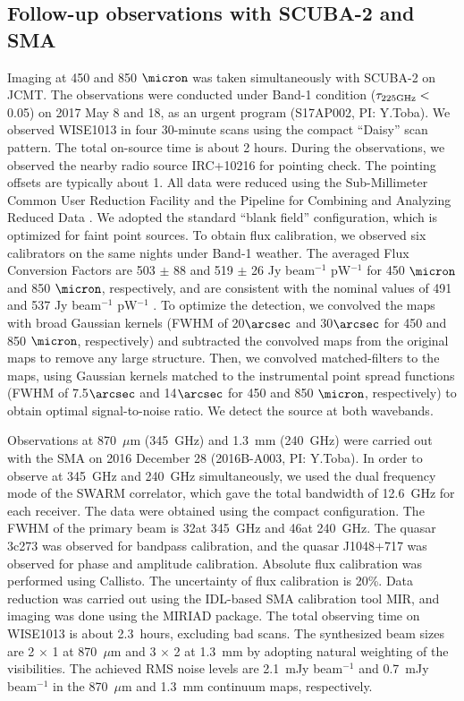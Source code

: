 \documentclass[twocolumn]{aastex6}
\begin{document}
\subsection{Follow-up observations with SCUBA-2 and SMA}
\label{F_obs}
Imaging at 450 and 850 $\micron$ was taken simultaneously with SCUBA-2 on JCMT. 
The observations were conducted under Band-1 condition ($\tau_{\rm 225GHz} <$ 0.05) on 2017 May 8 and 18, as an urgent program (S17AP002, PI: Y.Toba). 
We observed WISE1013 in four 30-minute scans using the compact ``Daisy'' scan pattern. 
The total on-source time is about 2 hours. 
During the observations, we observed the nearby radio source IRC+10216 for pointing check. 
The pointing offsets are typically about 1\arcsec.
All data were reduced using the Sub-Millimeter Common User Reduction Facility \citep[SMURF: ][]{Chapin} and the Pipeline for Combining and Analyzing Reduced Data \citep[PICARD: ][]{Jenness}. 
We adopted the standard ``blank field'' configuration, which is optimized for faint point sources. 
To obtain flux calibration, we observed six calibrators on the same nights under Band-1 weather. 
The averaged Flux Conversion Factors are 503 $\pm$ 88 and 519 $\pm$ 26 Jy beam$^{-1}$ pW$^{-1}$ for 450 $\micron$ and 850 $\micron$, respectively, and are consistent with the nominal values of 491 and 537 Jy beam$^{-1}$ pW$^{-1}$ \citep{Dempsey}.
To optimize the detection, we convolved the maps with broad Gaussian kernels (FWHM of 20$\arcsec$ and 30$\arcsec$ for 450 and 850 $\micron$, respectively) and subtracted the convolved maps from the original maps to remove any large structure. 
Then, we convolved matched-filters to the maps, using Gaussian kernels matched to the instrumental point spread functions (FWHM of 7.5$\arcsec$ and 14$\arcsec$ for 450 and 850 $\micron$, respectively) to obtain optimal signal-to-noise ratio. 
We detect the source at both wavebands. 

Observations at 870~$\mu$m (345~GHz) and 1.3~mm (240~GHz) were carried out with the SMA on 2016 December 28 (2016B-A003, PI: Y.Toba).  
In order to observe at 345~GHz and 240~GHz simultaneously, we used the dual frequency mode of the SWARM correlator, which gave the total bandwidth of 12.6~GHz for each receiver.  
The data were obtained using the compact configuration.  
The FWHM of the primary beam is 32\arcsec at 345~GHz and 46\arcsec at 240~GHz.  
The quasar 3c273 was observed for bandpass calibration,  and the quasar J1048+717 was observed for phase and amplitude calibration.  
Absolute flux calibration was performed using Callisto.  
The uncertainty of flux calibration is 20\%.
Data reduction was carried out using the IDL-based SMA calibration tool MIR, and imaging was done using the MIRIAD package.  
The total observing time on WISE1013 is about 2.3~hours, excluding bad scans.  
The synthesized beam sizes are 2 $\times$ 1 at 870~$\mu$m  and 3 $\times$ 2 at 1.3~mm  by adopting natural weighting of the visibilities.  
The achieved RMS noise levels are 2.1~mJy beam$^{-1}$ and 0.7~mJy beam$^{-1}$ in the 870~$\mu$m and 1.3~mm continuum maps, respectively.
   
\end{document}
